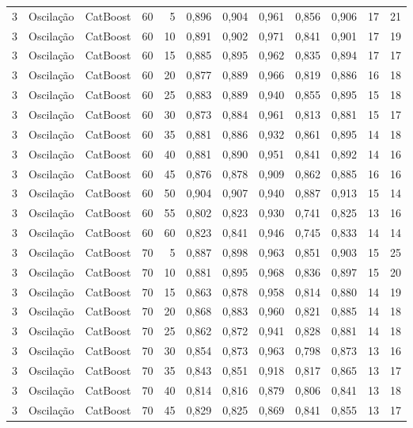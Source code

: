 \begin{longtable}{@{}rllrrrrrrrrr@{}}
3 & Oscilação & CatBoost & 60 & 5 & 0,896 & 0,904 & 0,961 & 0,856 & 0,906 & 17 & 21 \\
3 & Oscilação & CatBoost & 60 & 10 & 0,891 & 0,902 & 0,971 & 0,841 & 0,901 & 17 & 19 \\
3 & Oscilação & CatBoost & 60 & 15 & 0,885 & 0,895 & 0,962 & 0,835 & 0,894 & 17 & 17 \\
3 & Oscilação & CatBoost & 60 & 20 & 0,877 & 0,889 & 0,966 & 0,819 & 0,886 & 16 & 18 \\
3 & Oscilação & CatBoost & 60 & 25 & 0,883 & 0,889 & 0,940 & 0,855 & 0,895 & 15 & 18 \\
3 & Oscilação & CatBoost & 60 & 30 & 0,873 & 0,884 & 0,961 & 0,813 & 0,881 & 15 & 17 \\
3 & Oscilação & CatBoost & 60 & 35 & 0,881 & 0,886 & 0,932 & 0,861 & 0,895 & 14 & 18 \\
3 & Oscilação & CatBoost & 60 & 40 & 0,881 & 0,890 & 0,951 & 0,841 & 0,892 & 14 & 16 \\
3 & Oscilação & CatBoost & 60 & 45 & 0,876 & 0,878 & 0,909 & 0,862 & 0,885 & 16 & 16 \\
3 & Oscilação & CatBoost & 60 & 50 & 0,904 & 0,907 & 0,940 & 0,887 & 0,913 & 15 & 14 \\
3 & Oscilação & CatBoost & 60 & 55 & 0,802 & 0,823 & 0,930 & 0,741 & 0,825 & 13 & 16 \\
3 & Oscilação & CatBoost & 60 & 60 & 0,823 & 0,841 & 0,946 & 0,745 & 0,833 & 14 & 14 \\
3 & Oscilação & CatBoost & 70 & 5 & 0,887 & 0,898 & 0,963 & 0,851 & 0,903 & 15 & 25 \\
3 & Oscilação & CatBoost & 70 & 10 & 0,881 & 0,895 & 0,968 & 0,836 & 0,897 & 15 & 20 \\
3 & Oscilação & CatBoost & 70 & 15 & 0,863 & 0,878 & 0,958 & 0,814 & 0,880 & 14 & 19 \\
3 & Oscilação & CatBoost & 70 & 20 & 0,868 & 0,883 & 0,960 & 0,821 & 0,885 & 14 & 18 \\
3 & Oscilação & CatBoost & 70 & 25 & 0,862 & 0,872 & 0,941 & 0,828 & 0,881 & 14 & 18 \\
3 & Oscilação & CatBoost & 70 & 30 & 0,854 & 0,873 & 0,963 & 0,798 & 0,873 & 13 & 16 \\
3 & Oscilação & CatBoost & 70 & 35 & 0,843 & 0,851 & 0,918 & 0,817 & 0,865 & 13 & 17 \\
3 & Oscilação & CatBoost & 70 & 40 & 0,814 & 0,816 & 0,879 & 0,806 & 0,841 & 13 & 18 \\
3 & Oscilação & CatBoost & 70 & 45 & 0,829 & 0,825 & 0,869 & 0,841 & 0,855 & 13 & 17 \\

\end{longtable}
